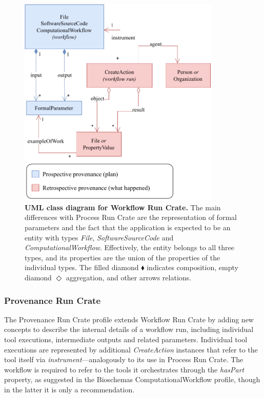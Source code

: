 \begin{figure}[htp]
\includegraphics[width=26em]{figures/ch54/wrroc-figure2.drawio.pdf}
\caption[UML class diagram]{{\bf UML class diagram for Workflow Run Crate.}
The main differences with Process Run Crate are the representation of formal parameters and the fact that the application is expected to be an entity with types \emph{File}, \emph{SoftwareSourceCode} and \emph{ComputationalWorkflow}.
Effectively, the entity belongs to all three types, and its properties are the union of the properties of the individual types.
The filled diamond $\blacklozenge$ indicates composition, empty diamond $\Diamond$ aggregation, and other arrows relations.
}
\label{ch54:fig:workflow_crate_er}
\end{figure}


\subsubsection{Provenance Run Crate}\label{ch54:provenance-run-crate}

The Provenance Run Crate profile \cite{WRROC 2023c} extends Workflow Run Crate by adding new concepts to describe the internal details of a workflow run, including individual tool executions, intermediate outputs and related parameters.
Individual tool executions are represented by additional \emph{CreateAction} instances that refer to the tool itself via \emph{instrument}---analogously to its use in Process Run Crate.
The workflow is required to refer to the tools it orchestrates through the \emph{hasPart} property, as suggested in the Bioschemas ComputationalWorkflow profile, though in the latter it is only a recommendation.

